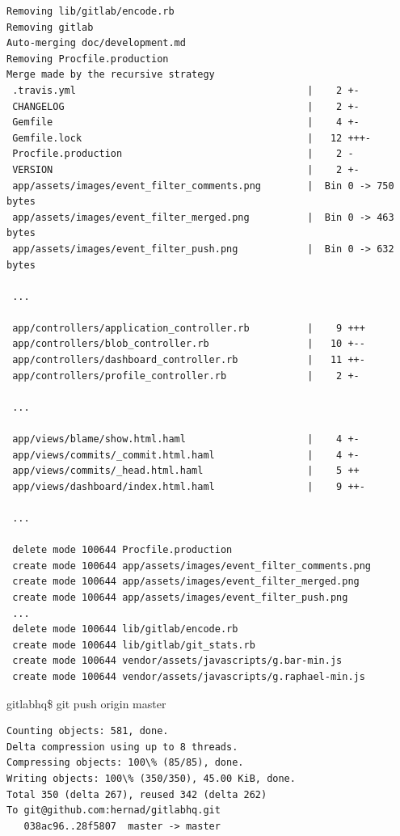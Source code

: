 \documentclass[times, utf8, seminar]{fit}
\begin{document}
\begin{lstlisting}
Removing lib/gitlab/encode.rb
Removing gitlab
Auto-merging doc/development.md
Removing Procfile.production
Merge made by the recursive strategy
 .travis.yml                                        |    2 +-
 CHANGELOG                                          |    2 +-
 Gemfile                                            |    4 +-
 Gemfile.lock                                       |   12 +++-
 Procfile.production                                |    2 -
 VERSION                                            |    2 +-
 app/assets/images/event_filter_comments.png        |  Bin 0 -> 750 bytes
 app/assets/images/event_filter_merged.png          |  Bin 0 -> 463 bytes
 app/assets/images/event_filter_push.png            |  Bin 0 -> 632 bytes
 
 ...

 app/controllers/application_controller.rb          |    9 +++
 app/controllers/blob_controller.rb                 |   10 +--
 app/controllers/dashboard_controller.rb            |   11 ++-
 app/controllers/profile_controller.rb              |    2 +-

 ...

 app/views/blame/show.html.haml                     |    4 +-
 app/views/commits/_commit.html.haml                |    4 +-
 app/views/commits/_head.html.haml                  |    5 ++
 app/views/dashboard/index.html.haml                |    9 ++-
 
 ... 
 
 delete mode 100644 Procfile.production
 create mode 100644 app/assets/images/event_filter_comments.png
 create mode 100644 app/assets/images/event_filter_merged.png
 create mode 100644 app/assets/images/event_filter_push.png
 ...
 delete mode 100644 lib/gitlab/encode.rb
 create mode 100644 lib/gitlab/git_stats.rb
 create mode 100644 vendor/assets/javascripts/g.bar-min.js
 create mode 100644 vendor/assets/javascripts/g.raphael-min.js
\end{lstlisting}



gitlabhq\$ git push origin master

\begin{lstlisting}
Counting objects: 581, done.
Delta compression using up to 8 threads.
Compressing objects: 100\% (85/85), done.
Writing objects: 100\% (350/350), 45.00 KiB, done.
Total 350 (delta 267), reused 342 (delta 262)
To git@github.com:hernad/gitlabhq.git
   038ac96..28f5807  master -> master

\end{lstlisting}
\end{document}
